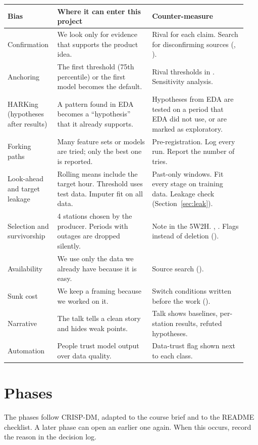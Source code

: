 \documentclass[11pt]{article}
\begin{document}
\small
\begin{longtable}{@{}P{0.18\linewidth} P{0.38\linewidth} P{0.38\linewidth}@{}}
\toprule
\textbf{Bias} & \textbf{Where it can enter this project} & \textbf{Counter-measure} \\
\midrule\endhead
\bottomrule\endfoot
Confirmation & We look only for evidence that supports the product idea. & Rival for each claim. Search for disconfirming sources (, ). \\
Anchoring & The first threshold (75th percentile) or the first model becomes the default. & Rival thresholds in . Sensitivity analysis. \\
HARKing (hypotheses after results) & A pattern found in EDA becomes a ``hypothesis'' that it already supports. & Hypotheses from EDA are tested on a period that EDA did not use, or are marked as exploratory. \\
Forking paths & Many feature sets or models are tried; only the best one is reported. & Pre-registration. Log every run. Report the number of tries. \\
Look-ahead and target leakage & Rolling means include the target hour. Threshold uses test data. Imputer fit on all data. & Past-only windows. Fit every stage on training data. Leakage check (Section~\ref{sec:leak}). \\
Selection and survivorship & 4 stations chosen by the producer. Periods with outages are dropped silently. & Note in the 5W2H. , . Flags instead of deletion (). \\
Availability & We use only the data we already have because it is easy. & Source search (). \\
Sunk cost & We keep a framing because we worked on it. & Switch conditions written before the work (). \\
Narrative & The talk tells a clean story and hides weak points. & Talk shows baselines, per-station results, refuted hypotheses. \\
Automation & People trust model output over data quality. & Data-trust flag shown next to each class. \\
\end{longtable}
\normalsize

\section{Phases}
The phases follow CRISP-DM, adapted to the course brief and to the README checklist.
A later phase can open an earlier one again. When this occurs, record the reason in the decision log.
\end{document}
